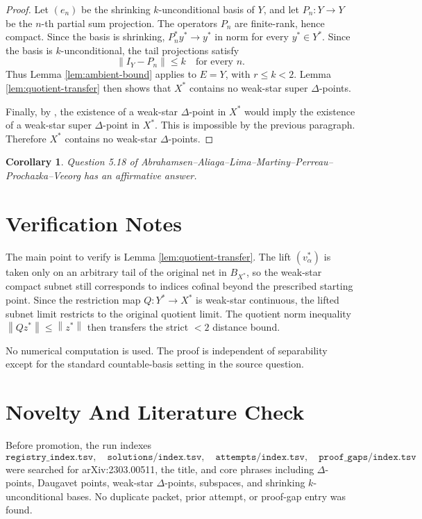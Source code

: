 \documentclass[11pt]{article}
\newtheorem{corollary}{Corollary}
\newcommand{\norm}[1]{\left\lVert #1 \right\rVert}
\newcommand{\ball}{B}
\newcommand{\id}{I}
\begin{document}
\begin{proof}
Let \((e_n)\) be the shrinking \(k\)-unconditional basis of \(Y\), and let
\(P_n:Y\to Y\) be the \(n\)-th partial sum projection.  The operators \(P_n\)
are finite-rank, hence compact.  Since the basis is shrinking, \(P_n^*y^*\to
y^*\) in norm for every \(y^*\in Y^*\).  Since the basis is
\(k\)-unconditional, the tail projections satisfy
\[
  \norm{\id_Y-P_n}\le k
  \quad\text{for every }n.
\]
Thus Lemma \ref{lem:ambient-bound} applies to \(E=Y\), with \(r\le k<2\).
Lemma \ref{lem:quotient-transfer} then shows that \(X^*\) contains no
weak-star super \(\Delta\)-points.

Finally, by \cite[Theorem 5.6]{AALMPPV2023}, the existence of a weak-star
\(\Delta\)-point in \(X^*\) would imply the existence of a weak-star super
\(\Delta\)-point in \(X^*\).  This is impossible by the previous paragraph.
Therefore \(X^*\) contains no weak-star \(\Delta\)-points.
\end{proof}

\begin{corollary}
Question 5.18 of Abrahamsen--Aliaga--Lima--Martiny--Perreau--Prochazka--Veeorg
has an affirmative answer.
\end{corollary}

\section*{Verification Notes}

The main point to verify is Lemma \ref{lem:quotient-transfer}.  The lift
\((v_\alpha^*)\) is taken only on an arbitrary tail of the original net in
\(\ball_{X^*}\), so the weak-star compact subnet still corresponds to indices
cofinal beyond the prescribed starting point.  Since the restriction map
\(Q:Y^*\to X^*\) is weak-star continuous, the lifted subnet limit restricts to
the original quotient limit.  The quotient norm inequality
\(\norm{Qz^*}\le\norm{z^*}\) then transfers the strict \(<2\) distance bound.

No numerical computation is used.  The proof is independent of separability
except for the standard countable-basis setting in the source question.

\section*{Novelty And Literature Check}

Before promotion, the run indexes
\[
\texttt{registry\_index.tsv},\quad
\texttt{solutions/index.tsv},\quad
\texttt{attempts/index.tsv},\quad
\texttt{proof\_gaps/index.tsv}
\]
were searched for arXiv:2303.00511, the title, and core phrases including
\(\Delta\)-points, Daugavet points, weak-star \(\Delta\)-points, subspaces,
and shrinking \(k\)-unconditional bases.  No duplicate packet, prior attempt,
or proof-gap entry was found.
\end{document}
